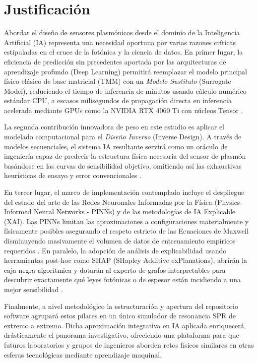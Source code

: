 \chapter{Justificación}\label{chapter:PA}

Abordar el diseño de sensores plasmónicos desde el dominio de la Inteligencia Artificial (IA) representa una necesidad oportuna por varias razones críticas estipuladas en el cruce de la fotónica y la ciencia de datos. En primer lugar, la eficiencia de predicción sin precedentes aportada por las arquitecturas de aprendizaje profundo (Deep Learning) permitirá reemplazar el modelo principal físico clásico de base matricial (TMM) con un \textit{Modelo Sustituto} (Surrogate Model), reduciendo el tiempo de inferencia de minutos usando cálculo numérico estándar CPU, a escasos milisegundos de propagación directa en inferencia acelerada mediante GPUs como la NVIDIA RTX 4060 Ti con núcleos Tensor \cite{surrogate_optics}.

La segunda contribución innovadora de peso en este estudio es aplicar el modelado computacional para el \textit{Diseño Inverso} (Inverse Design). A través de modelos secuenciales, el sistema IA resultante servirá como un oráculo de ingeniería capaz de predecir la estructura física necesaria del sensor de plasmón basándose en las curvas de sensibilidad objetivo, omitiendo así las exhaustivas heurísticas de ensayo y error convencionales \cite{ml_plasmonic_inverse}.

En tercer lugar, el marco de implementación contemplado incluye el despliegue del estado del arte de las Redes Neuronales Informadas por la Física (Physics-Informed Neural Networks - PINNs) y de las metodologías de IA Explicable (XAI). Las PINNs limitan las aproximaciones a configuraciones materialmente y físicamente posibles asegurando el respeto estricto de las Ecuaciones de Maxwell disminuyendo masivamente el volumen de datos de entrenamiento empíricos requeridos \cite{pinn_nanophotonics}. En paralelo, la adopción de análisis de explicabilidad usando herramientas post-hoc como SHAP (SHapley Additive exPlanations), abrirán la caja negra algorítmica y dotarán al experto de grafos interpretables para descubrir exactamente qué leyes fotónicas o de espesor están incidiendo a una mejor sensibilidad \cite{xai_spr_sensors}.

Finalmente, a nivel metodológico la estructuración y apertura del repositorio software agrupará estos pilares en un único simulador de resonancia SPR de extremo a extremo. Dicha aproximación integrativa en IA aplicada enriquecerá drásticamente el panorama investigativo, ofreciendo una plataforma para que futuros laboratorios y grupos de ingenieros aborden retos físicos similares en otras esferas tecnológicas mediante aprendizaje maquinal.
